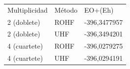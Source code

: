\documentclass[]{article}
\begin{document}
\begin{longtable}[]{@{}lll@{}}
\toprule
\begin{minipage}[t]{0.30\columnwidth}\raggedright\strut
{Multiplicidad}\strut
\end{minipage} & \begin{minipage}[t]{0.30\columnwidth}\raggedright\strut
{Método}\strut
\end{minipage} & \begin{minipage}[t]{0.30\columnwidth}\raggedright\strut
{E}{O}{+}{(E}{h}{)}\strut
\end{minipage}\tabularnewline
\begin{minipage}[t]{0.30\columnwidth}\raggedright\strut
{2 (doblete)}\strut
\end{minipage} & \begin{minipage}[t]{0.30\columnwidth}\raggedright\strut
{ROHF}\strut
\end{minipage} & \begin{minipage}[t]{0.30\columnwidth}\raggedright\strut
{-396,3477957}\strut
\end{minipage}\tabularnewline
\begin{minipage}[t]{0.30\columnwidth}\raggedright\strut
{2 (doblete)}\strut
\end{minipage} & \begin{minipage}[t]{0.30\columnwidth}\raggedright\strut
{UHF}\strut
\end{minipage} & \begin{minipage}[t]{0.30\columnwidth}\raggedright\strut
{-396,3494201}\strut
\end{minipage}\tabularnewline
\begin{minipage}[t]{0.30\columnwidth}\raggedright\strut
{4 (cuartete)}\strut
\end{minipage} & \begin{minipage}[t]{0.30\columnwidth}\raggedright\strut
{ROHF}\strut
\end{minipage} & \begin{minipage}[t]{0.30\columnwidth}\raggedright\strut
{-396,0279275}\strut
\end{minipage}\tabularnewline
\begin{minipage}[t]{0.30\columnwidth}\raggedright\strut
{4 (cuartete)}\strut
\end{minipage} & \begin{minipage}[t]{0.30\columnwidth}\raggedright\strut
{UHF}\strut
\end{minipage} & \begin{minipage}[t]{0.30\columnwidth}\raggedright\strut
{-396,0294191}\strut
\end{minipage}\tabularnewline
\bottomrule
\end{longtable}
\end{document}
